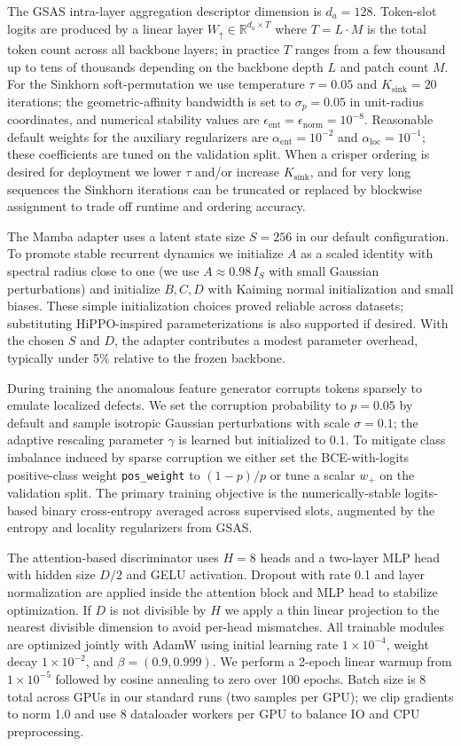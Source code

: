 The GSAS intra-layer aggregation descriptor dimension is $d_a=128$. Token-slot logits are produced by a linear layer $W_{\uparrow}\in\mathbb{R}^{d_a\times T}$ where $T=L\cdot M$ is the total token count across all backbone layers; in practice $T$ ranges from a few thousand up to tens of thousands depending on the backbone depth $L$ and patch count $M$. For the Sinkhorn soft-permutation we use temperature $\tau=0.05$ and $K_{\mathrm{sink}}=20$ iterations; the geometric-affinity bandwidth is set to $\sigma_p=0.05$ in unit-radius coordinates, and numerical stability values are $\epsilon_{\mathrm{ent}}=\epsilon_{\mathrm{norm}}=10^{-8}$. Reasonable default weights for the auxiliary regularizers are $\alpha_{\mathrm{ent}}=10^{-2}$ and $\alpha_{\mathrm{loc}}=10^{-1}$; these coefficients are tuned on the validation split. When a crisper ordering is desired for deployment we lower $\tau$ and/or increase $K_{\mathrm{sink}}$, and for very long sequences the Sinkhorn iterations can be truncated or replaced by blockwise assignment to trade off runtime and ordering accuracy.

The Mamba adapter uses a latent state size $S=256$ in our default configuration. To promote stable recurrent dynamics we initialize $A$ as a scaled identity with spectral radius close to one (we use $A\approx 0.98\,I_S$ with small Gaussian perturbations) and initialize $B,C,D$ with Kaiming normal initialization and small biases. These simple initialization choices proved reliable across datasets; substituting HiPPO-inspired parameterizations is also supported if desired. With the chosen $S$ and $D$, the adapter contributes a modest parameter overhead, typically under 5\% relative to the frozen backbone.

During training the anomalous feature generator corrupts tokens sparsely to emulate localized defects. We set the corruption probability to $p=0.05$ by default and sample isotropic Gaussian perturbations with scale $\sigma=0.1$; the adaptive rescaling parameter $\gamma$ is learned but initialized to $0.1$. To mitigate class imbalance induced by sparse corruption we either set the BCE-with-logits positive-class weight \texttt{pos\_weight} to $(1-p)/p$ or tune a scalar $w_{+}$ on the validation split. The primary training objective is the numerically-stable logits-based binary cross-entropy averaged across supervised slots, augmented by the entropy and locality regularizers from GSAS.

The attention-based discriminator uses $H=8$ heads and a two-layer MLP head with hidden size $D/2$ and GELU activation. Dropout with rate 0.1 and layer normalization are applied inside the attention block and MLP head to stabilize optimization. If $D$ is not divisible by $H$ we apply a thin linear projection to the nearest divisible dimension to avoid per-head mismatches. All trainable modules are optimized jointly with AdamW using initial learning rate $1\times 10^{-4}$, weight decay $1\times 10^{-2}$, and $\beta=(0.9,0.999)$. We perform a 2-epoch linear warmup from $1\times 10^{-5}$ followed by cosine annealing to zero over 100 epochs. Batch size is 8 total across GPUs in our standard runs (two samples per GPU); we clip gradients to norm 1.0 and use 8 dataloader workers per GPU to balance IO and CPU preprocessing.

